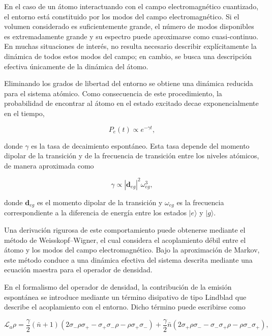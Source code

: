 \documentclass[11pt]{report}
\begin{document}
En el caso de un átomo interactuando con el campo electromagnético cuantizado, el entorno está constituido por los modos del campo electromagnético. Si el volumen considerado es suficientemente grande, el número de modos disponibles es extremadamente grande y su espectro puede aproximarse como cuasi-continuo. En muchas situaciones de interés, no resulta necesario describir explícitamente la dinámica de todos estos modos del campo; en cambio, se busca una descripción efectiva únicamente de la dinámica del átomo.

Eliminando los grados de libertad del entorno se obtiene una dinámica reducida para el sistema atómico. Como consecuencia de este procedimiento, la probabilidad de encontrar al átomo en el estado excitado decae exponencialmente en el tiempo,

\begin{equation}
P_e(t) \propto e^{-\gamma t},
\end{equation}

donde $\gamma$ es la tasa de decaimiento espontáneo. Esta tasa depende del momento dipolar de la transición y de la frecuencia de transición entre los niveles atómicos, de manera aproximada como

\begin{equation}
\gamma \propto |\mathbf{d}_{eg}|^2 \omega_{eg}^3 ,
\end{equation}

donde $\mathbf{d}_{eg}$ es el momento dipolar de la transición y $\omega_{eg}$ es la frecuencia correspondiente a la diferencia de energía entre los estados $|e\rangle$ y $|g\rangle$.

Una derivación rigurosa de este comportamiento puede obtenerse mediante el método de Weisskopf--Wigner, el cual considera el acoplamiento débil entre el átomo y los modos del campo electromagnético. Bajo la aproximación de Markov, este método conduce a una dinámica efectiva del sistema descrita mediante una ecuación maestra para el operador de densidad.

En el formalismo del operador de densidad, la contribución de la emisión espontánea se introduce mediante un término disipativo de tipo Lindblad que describe el acoplamiento con el entorno. Dicho término puede escribirse como

\begin{equation}
\mathcal{L}_a \rho =
\frac{\gamma}{2}(\bar{n}+1)
\left(
2\sigma_- \rho \sigma_+ -
\sigma_+\sigma_- \rho -
\rho \sigma_+\sigma_-
\right)
+
\frac{\gamma}{2}\bar{n}
\left(
2\sigma_+ \rho \sigma_- -
\sigma_- \sigma_+ \rho -
\rho \sigma_- \sigma_+
\right),
\end{equation}
\end{document}
